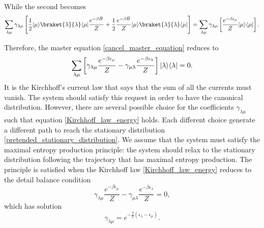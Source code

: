 While the second becomes
\begin{equation}
    \sum_{\lambda\mu} \gamma_{\lambda\mu}\left[\frac{1}{2}\ket{\mu}\braket{\lambda}{\lambda}\bra{\mu}\frac{e^{-\beta\hat H}}{Z} +\frac{1}{2}\frac{e^{-\beta\hat H}}{Z}\ket{\mu}\braket{\lambda}{\lambda}\bra{\mu}\right]= \sum_{\lambda\mu} \gamma_{\lambda\mu}\left[\frac{e^{-\beta \epsilon_\mu}}{Z}\ket{\mu}\bra{\mu}\right].
\end{equation}

Therefore, the master equation \eqref{cancel_master_equation} reduces to 
\begin{equation}\label{Kirchhoff_law_energy}
    \sum_{\lambda\mu}\left[\gamma_{\lambda\mu}\frac{e^{-\beta \epsilon_\mu}}{Z} - \gamma_{\mu\lambda}\frac{e^{-\beta \epsilon_\lambda}}{Z}\right]\lvert\lambda\rangle\langle\lambda\rvert = 0.
\end{equation}
It is the Kirchhoff's current law that says that the sum of all the currents must vanish. The system should satisfy this request in order to have the canonical distribution.
However, there are several possible choice for the coefficients $\gamma_{\lambda\mu}$ such that equation \eqref{Kirchhoff_law_energy} holds.
Each different choice generate a different path to reach the stationary distribution \eqref{pretended_stationary_distribution}. We assume that the system must satisfy the maximal entropy production principle: the system should relax to the stationary distribution following the trajectory that has maximal entropy production. The principle is satisfied when the Kirchhoff law \eqref{Kirchhoff_law_energy} reduces to the detail balance condition
\begin{equation}
    \gamma_{\lambda\mu}\frac{e^{-\beta \epsilon_\mu}}{Z} - \gamma_{\mu\lambda}\frac{e^{-\beta \epsilon_\lambda}}{Z} = 0,
\end{equation}
which has solution
\begin{equation}\label{gamma_detailed_balance}
    \gamma_{\lambda\mu} = e^{-\frac{\beta}{2}\left(\epsilon_\lambda - \epsilon_\mu\right)}.
\end{equation}

